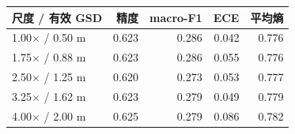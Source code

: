 \begin{tabular}{lrrrr}
\hline
尺度 / 有效 GSD & 精度 & macro-F1 & ECE & 平均熵 \\
\hline
1.00$\times$ / 0.50 m & 0.623 & 0.286 & 0.042 & 0.776 \\
1.75$\times$ / 0.88 m & 0.623 & 0.286 & 0.055 & 0.776 \\
2.50$\times$ / 1.25 m & 0.620 & 0.273 & 0.053 & 0.777 \\
3.25$\times$ / 1.62 m & 0.623 & 0.279 & 0.049 & 0.779 \\
4.00$\times$ / 2.00 m & 0.625 & 0.279 & 0.086 & 0.782 \\
\hline
\end{tabular}

